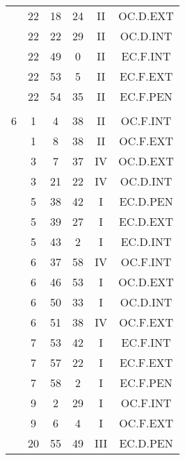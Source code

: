 \documentclass[12pt, a4paper]{article}
\begin{document}
\begin{multicols}{3}
{\begin{tabular}{c c c c c c}
	 	 	 	 & 22 & 18 & 24 & II & OC.D.EXT\\%
	 	 	 	 & 22 & 22 & 29 & II & OC.D.INT\\%
	 	 	 	 & 22 & 49 & 0 & II & EC.F.INT\\%
	 	 	 	 & 22 & 53 & 5 & II & EC.F.EXT\\%
	 	 	 	 & 22 & 54 & 35 & II & EC.F.PEN\\%
	 	 	 	 & & & & & \\%
	 	 	 	6 & 1 & 4 & 38 & II & OC.F.INT\\%
	 	 	 	 & 1 & 8 & 38 & II & OC.F.EXT\\%
	 	 	 	 & 3 & 7 & 37 & IV & OC.D.EXT\\%
	 	 	 	 & 3 & 21 & 22 & IV & OC.D.INT\\%
	 	 	 	 & 5 & 38 & 42 & I & EC.D.PEN\\%
	 	 	 	 & 5 & 39 & 27 & I & EC.D.EXT\\%
	 	 	 	 & 5 & 43 & 2 & I & EC.D.INT\\%
	 	 	 	 & 6 & 37 & 58 & IV & OC.F.INT\\%
	 	 	 	 & 6 & 46 & 53 & I & OC.D.EXT\\%
	 	 	 	 & 6 & 50 & 33 & I & OC.D.INT\\%
	 	 	 	 & 6 & 51 & 38 & IV & OC.F.EXT\\%
	 	 	 	 & 7 & 53 & 42 & I & EC.F.INT\\%
	 	 	 	 & 7 & 57 & 22 & I & EC.F.EXT\\%
	 	 	 	 & 7 & 58 & 2 & I & EC.F.PEN\\%
	 	 	 	 & 9 & 2 & 29 & I & OC.F.INT\\%
	 	 	 	 & 9 & 6 & 4 & I & OC.F.EXT\\%
	 	 	 	 & 20 & 55 & 49 & III & EC.D.PEN\\%

\end{tabular}}
\end{multicols}
\end{document}

